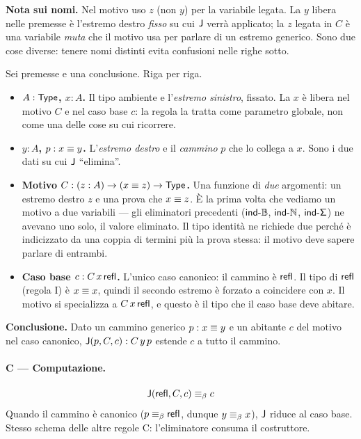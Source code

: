 \noindent\textbf{Nota sui nomi.} Nel motivo uso $z$ (non $y$) per la variabile legata. La $y$ libera nelle premesse \`e l'estremo destro \emph{fisso} su cui $\mathsf{J}$ verr\`a applicato; la $z$ legata in $C$ \`e una variabile \emph{muta} che il motivo usa per parlare di un estremo generico. Sono due cose diverse: tenere nomi distinti evita confusioni nelle righe sotto.

\noindent Sei premesse e una conclusione. Riga per riga.

\begin{itemize}
\item \textbf{$A : \mathsf{Type}$, $x : A$.} Il tipo ambiente e l'\emph{estremo sinistro}, fissato. La $x$ \`e libera nel motivo $C$ e nel caso base $c$: la regola la tratta come parametro globale, non come una delle cose su cui ricorrere.
\item \textbf{$y : A$, $p : x \equiv y$.} L'\emph{estremo destro} e il \emph{cammino} $p$ che lo collega a $x$. Sono i due dati su cui $\mathsf{J}$ ``elimina''.
\item \textbf{Motivo $C : (z : A) \to (x \equiv z) \to \mathsf{Type}$.} Una funzione di \emph{due} argomenti: un estremo destro $z$ e una prova che $x \equiv z$. \`E la prima volta che vediamo un motivo a due variabili --- gli eliminatori precedenti ($\mathsf{ind\text{-}\mathbb{B}}$, $\mathsf{ind\text{-}\mathbb{N}}$, $\mathsf{ind\text{-}\Sigma}$) ne avevano uno solo, il valore eliminato. Il tipo identit\`a ne richiede due perch\'e \`e indicizzato da una coppia di termini pi\`u la prova stessa: il motivo deve sapere parlare di entrambi.
\item \textbf{Caso base $c : C\,x\,\mathsf{refl}$.} L'unico caso canonico: il cammino \`e $\mathsf{refl}$. Il tipo di $\mathsf{refl}$ (regola I) \`e $x \equiv x$, quindi il secondo estremo \`e forzato a coincidere con $x$. Il motivo si specializza a $C\,x\,\mathsf{refl}$, e questo \`e il tipo che il caso base deve abitare.
\end{itemize}

\noindent\textbf{Conclusione.} Dato un cammino generico $p : x \equiv y$ e un abitante $c$ del motivo nel caso canonico, $\mathsf{J}(p, C, c) : C\,y\,p$ estende $c$ a tutto il cammino.

\paragraph{C --- Computazione.}
\[
\mathsf{J}(\mathsf{refl}, C, c) \equiv_{\beta} c
\]
Quando il cammino \`e canonico ($p \equiv_{\beta} \mathsf{refl}$, dunque $y \equiv_{\beta} x$), $\mathsf{J}$ riduce al caso base. Stesso schema delle altre regole C: l'eliminatore consuma il costruttore.

